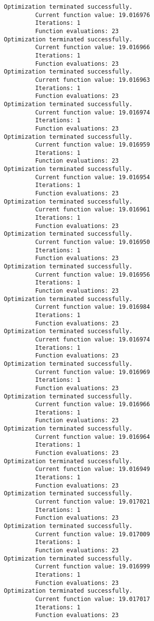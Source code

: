 \documentclass[11pt]{article}
\begin{document}
\begin{Verbatim}[commandchars=\\\{\}]
Optimization terminated successfully.
         Current function value: 19.016976
         Iterations: 1
         Function evaluations: 23
Optimization terminated successfully.
         Current function value: 19.016966
         Iterations: 1
         Function evaluations: 23
Optimization terminated successfully.
         Current function value: 19.016963
         Iterations: 1
         Function evaluations: 23
Optimization terminated successfully.
         Current function value: 19.016974
         Iterations: 1
         Function evaluations: 23
Optimization terminated successfully.
         Current function value: 19.016959
         Iterations: 1
         Function evaluations: 23
Optimization terminated successfully.
         Current function value: 19.016954
         Iterations: 1
         Function evaluations: 23
Optimization terminated successfully.
         Current function value: 19.016961
         Iterations: 1
         Function evaluations: 23
Optimization terminated successfully.
         Current function value: 19.016950
         Iterations: 1
         Function evaluations: 23
Optimization terminated successfully.
         Current function value: 19.016956
         Iterations: 1
         Function evaluations: 23
Optimization terminated successfully.
         Current function value: 19.016984
         Iterations: 1
         Function evaluations: 23
Optimization terminated successfully.
         Current function value: 19.016974
         Iterations: 1
         Function evaluations: 23
Optimization terminated successfully.
         Current function value: 19.016969
         Iterations: 1
         Function evaluations: 23
Optimization terminated successfully.
         Current function value: 19.016966
         Iterations: 1
         Function evaluations: 23
Optimization terminated successfully.
         Current function value: 19.016964
         Iterations: 1
         Function evaluations: 23
Optimization terminated successfully.
         Current function value: 19.016949
         Iterations: 1
         Function evaluations: 23
Optimization terminated successfully.
         Current function value: 19.017021
         Iterations: 1
         Function evaluations: 23
Optimization terminated successfully.
         Current function value: 19.017009
         Iterations: 1
         Function evaluations: 23
Optimization terminated successfully.
         Current function value: 19.016999
         Iterations: 1
         Function evaluations: 23
Optimization terminated successfully.
         Current function value: 19.017017
         Iterations: 1
         Function evaluations: 23

\end{Verbatim}
\end{document}
